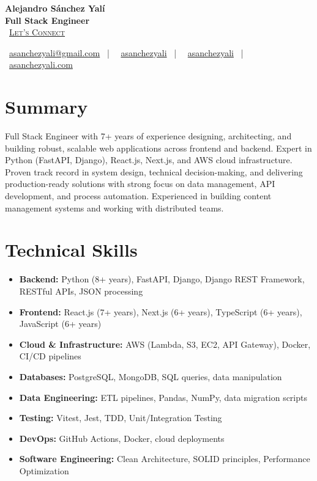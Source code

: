 \documentclass[letterpaper,11pt]{article}
\newcommand{\normalfaCalendar}{{\mdseries\faCalendar}}
\newcommand{\normalfaEnvelope}{{\mdseries\faEnvelope}}
\newcommand{\normalfaLinkedin}{{\mdseries\faLinkedin}}
\newcommand{\normalfaGithub}{{\mdseries\faGithub}}
\newcommand{\normalfaGlobe}{{\mdseries\faGlobe}}
\begin{document}
\begin{center}
\textbf{\Huge Alejandro Sánchez Yalí}\\[0.2em]
\textbf{\Large Full Stack Engineer}\\[0.4em]
\small
\normalfaCalendar\ \href{https://cal.com/asanchezyali/full-time-opportunities}{\textsc{Let's Connect}}

\vspace{0.8em}
\normalfaEnvelope\ \href{mailto:asanchezyali@gmail.com}{asanchezyali@gmail.com}  ~|~
\normalfaLinkedin\ \href{https://www.linkedin.com/in/asanchezyali}{asanchezyali} ~|~
\normalfaGithub\ \href{https://github.com/asanchezyali}{asanchezyali}  ~|~
\normalfaGlobe\ \href{https://asanchezyali.com}{asanchezyali.com}
\end{center}

\section{Summary}
Full Stack Engineer with 7+ years of experience designing, architecting, and building robust, scalable web applications across frontend and backend. Expert in Python (FastAPI, Django), React.js, Next.js, and AWS cloud infrastructure. Proven track record in system design, technical decision-making, and delivering production-ready solutions with strong focus on data management, API development, and process automation. Experienced in building content management systems and working with distributed teams.

\section{Technical Skills}
\begin{itemize}[leftmargin=*, itemsep=0pt]
  \item \textbf{Backend:} Python (8+ years), FastAPI, Django, Django REST Framework, RESTful APIs, JSON processing
  \item \textbf{Frontend:} React.js (7+ years), Next.js (6+ years), TypeScript (6+ years), JavaScript (6+ years)
  \item \textbf{Cloud \& Infrastructure:} AWS (Lambda, S3, EC2, API Gateway), Docker, CI/CD pipelines
  \item \textbf{Databases:} PostgreSQL, MongoDB, SQL queries, data manipulation
  \item \textbf{Data Engineering:} ETL pipelines, Pandas, NumPy, data migration scripts
  \item \textbf{Testing:} Vitest, Jest, TDD, Unit/Integration Testing
  \item \textbf{DevOps:} GitHub Actions, Docker, cloud deployments
  \item \textbf{Software Engineering:} Clean Architecture, SOLID principles, Performance Optimization
\end{itemize}
\end{document}
